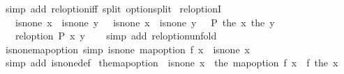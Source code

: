 \begin{isabellebody}
\ {\isacharparenleft}{\kern0pt}simp\ add{\isacharcolon}{\kern0pt}\ rel{\isacharunderscore}{\kern0pt}option{\isacharunderscore}{\kern0pt}iff\ split{\isacharcolon}{\kern0pt}\ option{\isachardot}{\kern0pt}split{\isacharparenright}{\kern0pt}%
\endisatagproof
{\isafoldproof}%
%
\isadelimproof
\isanewline
%
\endisadelimproof
\isanewline
{}\isamarkupfalse%
\ rel{\isacharunderscore}{\kern0pt}optionI{\isacharcolon}{\kern0pt}\isanewline
\ \ {\isachardoublequoteopen}{\isasymlbrakk}\ is{\isacharunderscore}{\kern0pt}none\ x\ {\isasymlongleftrightarrow}\ is{\isacharunderscore}{\kern0pt}none\ y{\isacharsemicolon}{\kern0pt}\ {\isasymlbrakk}\ {\isasymnot}\ is{\isacharunderscore}{\kern0pt}none\ x{\isacharsemicolon}{\kern0pt}\ {\isasymnot}\ is{\isacharunderscore}{\kern0pt}none\ y\ {\isasymrbrakk}\ {\isasymLongrightarrow}\ P\ {\isacharparenleft}{\kern0pt}the\ x{\isacharparenright}{\kern0pt}\ {\isacharparenleft}{\kern0pt}the\ y{\isacharparenright}{\kern0pt}\ {\isasymrbrakk}\isanewline
\ \ {\isasymLongrightarrow}\ rel{\isacharunderscore}{\kern0pt}option\ P\ x\ y{\isachardoublequoteclose}\isanewline
%
\isadelimproof
\ \ %
\endisadelimproof
%
\isatagproof
{}\isamarkupfalse%
\ {\isacharparenleft}{\kern0pt}simp\ add{\isacharcolon}{\kern0pt}\ rel{\isacharunderscore}{\kern0pt}option{\isacharunderscore}{\kern0pt}unfold{\isacharparenright}{\kern0pt}%
\endisatagproof
{\isafoldproof}%
%
\isadelimproof
\isanewline
%
\endisadelimproof
\isanewline
{}\isamarkupfalse%
\ is{\isacharunderscore}{\kern0pt}none{\isacharunderscore}{\kern0pt}map{\isacharunderscore}{\kern0pt}option\ {\isacharbrackleft}{\kern0pt}simp{\isacharbrackright}{\kern0pt}{\isacharcolon}{\kern0pt}\ {\isachardoublequoteopen}is{\isacharunderscore}{\kern0pt}none\ {\isacharparenleft}{\kern0pt}map{\isacharunderscore}{\kern0pt}option\ f\ x{\isacharparenright}{\kern0pt}\ {\isasymlongleftrightarrow}\ is{\isacharunderscore}{\kern0pt}none\ x{\isachardoublequoteclose}\isanewline
%
\isadelimproof
\ \ %
\endisadelimproof
%
\isatagproof
{}\isamarkupfalse%
\ {\isacharparenleft}{\kern0pt}simp\ add{\isacharcolon}{\kern0pt}\ is{\isacharunderscore}{\kern0pt}none{\isacharunderscore}{\kern0pt}def{\isacharparenright}{\kern0pt}%
\endisatagproof
{\isafoldproof}%
%
\isadelimproof
\isanewline
%
\endisadelimproof
\isanewline
{}\isamarkupfalse%
\ the{\isacharunderscore}{\kern0pt}map{\isacharunderscore}{\kern0pt}option{\isacharcolon}{\kern0pt}\ {\isachardoublequoteopen}{\isasymnot}\ is{\isacharunderscore}{\kern0pt}none\ x\ {\isasymLongrightarrow}\ the\ {\isacharparenleft}{\kern0pt}map{\isacharunderscore}{\kern0pt}option\ f\ x{\isacharparenright}{\kern0pt}\ {\isacharequal}{\kern0pt}\ f\ {\isacharparenleft}{\kern0pt}the\ x{\isacharparenright}{\kern0pt}{\isachardoublequoteclose}\isanewline

\end{isabellebody}
